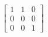 \[
  \left[
  \begin{array}{ccc}
	  1 & 1 & 0 \\
	  0 & 0 & 0 \\
	  0 & 0 & 1
  \end{array}
  \right]
  \]